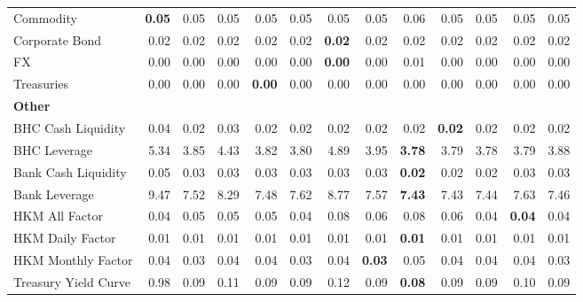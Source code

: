 \begin{tabular}{@{}lrrrrrrrrrrrr@{}}
Commodity & \textbf{0.05} & 0.05 & 0.05 & 0.05 & 0.05 & 0.05 & 0.05 & 0.06 & 0.05 & 0.05 & 0.05 & 0.05 \\
Corporate Bond & 0.02 & 0.02 & 0.02 & 0.02 & 0.02 & \textbf{0.02} & 0.02 & 0.02 & 0.02 & 0.02 & 0.02 & 0.02 \\
FX & 0.00 & 0.00 & 0.00 & 0.00 & 0.00 & \textbf{0.00} & 0.00 & 0.01 & 0.00 & 0.00 & 0.00 & 0.00 \\
Treasuries & 0.00 & 0.00 & 0.00 & \textbf{0.00} & 0.00 & 0.00 & 0.00 & 0.00 & 0.00 & 0.00 & 0.00 & 0.00 \\
\midrule
\multicolumn{13}{l}{\textbf{Other}} \\
BHC Cash Liquidity & 0.04 & 0.02 & 0.03 & 0.02 & 0.02 & 0.02 & 0.02 & 0.02 & \textbf{0.02} & 0.02 & 0.02 & 0.02 \\
BHC Leverage & 5.34 & 3.85 & 4.43 & 3.82 & 3.80 & 4.89 & 3.95 & \textbf{3.78} & 3.79 & 3.78 & 3.79 & 3.88 \\
Bank Cash Liquidity & 0.05 & 0.03 & 0.03 & 0.03 & 0.03 & 0.03 & 0.03 & \textbf{0.02} & 0.02 & 0.02 & 0.03 & 0.03 \\
Bank Leverage & 9.47 & 7.52 & 8.29 & 7.48 & 7.62 & 8.77 & 7.57 & \textbf{7.43} & 7.43 & 7.44 & 7.63 & 7.46 \\
HKM All Factor & 0.04 & 0.05 & 0.05 & 0.05 & 0.04 & 0.08 & 0.06 & 0.08 & 0.06 & 0.04 & \textbf{0.04} & 0.04 \\
HKM Daily Factor & 0.01 & 0.01 & 0.01 & 0.01 & 0.01 & 0.01 & 0.01 & \textbf{0.01} & 0.01 & 0.01 & 0.01 & 0.01 \\
HKM Monthly Factor & 0.04 & 0.03 & 0.04 & 0.04 & 0.03 & 0.04 & \textbf{0.03} & 0.05 & 0.04 & 0.04 & 0.04 & 0.03 \\
Treasury Yield Curve & 0.98 & 0.09 & 0.11 & 0.09 & 0.09 & 0.12 & 0.09 & \textbf{0.08} & 0.09 & 0.09 & 0.10 & 0.09 \\
\bottomrule
\end{tabular}